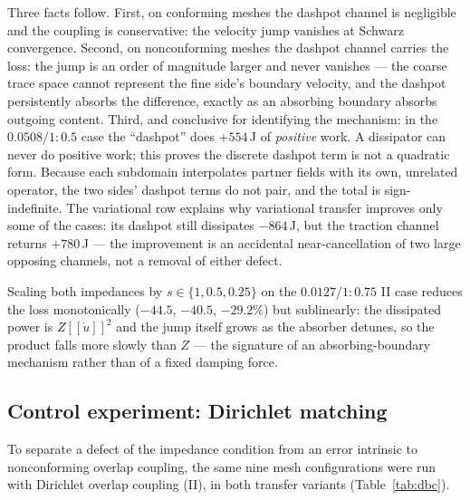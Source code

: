 \documentclass[11pt]{article}
\newcommand{\jump}[1]{[\![#1]\!]}
\begin{document}
Three facts follow. First, on conforming meshes the dashpot channel is
negligible and the coupling is conservative: the velocity jump vanishes at
Schwarz convergence. Second, on nonconforming meshes the dashpot channel
carries the loss: the jump is an order of magnitude larger and never vanishes
--- the coarse trace space cannot represent the fine side's boundary
velocity, and the dashpot persistently absorbs the difference, exactly as an
absorbing boundary absorbs outgoing content. Third, and conclusive for identifying the
mechanism: in the $0.0508$/$1{:}0.5$ case the ``dashpot'' does $+554$\,J of
\emph{positive} work. A dissipator can never do positive work; this proves
the discrete dashpot term is not a quadratic form. Because each subdomain
interpolates partner fields with its own, unrelated operator, the two sides'
dashpot terms do not pair, and the total is sign-indefinite. The variational
row explains why variational transfer improves only some of the cases: its dashpot
still dissipates $-864$\,J, but the traction channel returns $+780$\,J --- the
improvement is an accidental near-cancellation of two large opposing
channels, not a removal of either defect.

Scaling both impedances by $s \in \{1, 0.5, 0.25\}$ on the
$0.0127$/$1{:}0.75$ II case reduces the loss monotonically ($-44.5$, $-40.5$, $-29.2\%$) but
sublinearly: the dissipated power is $Z\jump{\dot u}^2$ and the jump itself
grows as the absorber detunes, so the product falls more slowly than $Z$ ---
the signature of an absorbing-boundary mechanism rather than of a fixed
damping force.

\subsection{Control experiment: Dirichlet matching}
\label{sec:dbc}

To separate a defect of the impedance condition from an error intrinsic
to nonconforming overlap coupling, the same nine mesh configurations were run
with Dirichlet overlap coupling (II), in both transfer variants
(Table~\ref{tab:dbc}).
\end{document}
